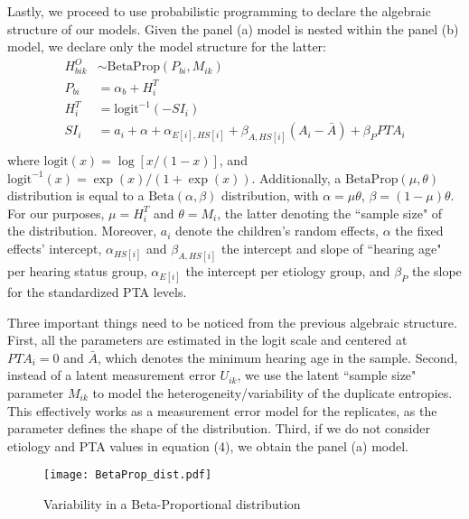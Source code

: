 Lastly, we proceed to use probabilistic programming to declare the algebraic structure of our models. Given the panel (a) model is nested within the panel (b) model, we declare only the model structure for the latter:
%
\begin{align}
	H^{O}_{bik} & \sim \text{BetaProp} \left( P_{bi}, M_{ik} \right) \\ 
	P_{bi} &= \alpha_{b} + H^{T}_{i} \\
	H^{T}_{i} &= \text{logit}^{-1}( -SI_{i} ) \\
	SI_{i} & = a_{i} + \alpha + \alpha_{E[i],HS[i]} + \beta_{A, HS[i]} (A_{i} - \bar{A}) + \beta_{P} PTA_{i} \\ 
\end{align}
%
where $\text{logit}(x) = \log \left[ x / ( 1 - x ) \right]$, and $\text{logit}^{-1}(x) = \exp(x) / ( 1 + \exp(x) ) $. Additionally, a $\text{BetaProp}(\mu, \theta)$ distribution is equal to a $\text{Beta}(\alpha, \beta)$ distribution, with $\alpha=\mu \theta$, $\beta=(1-\mu)\theta$. For our purposes, $\mu = H^{T}_{i}$ and $\theta = M_{i}$, the latter denoting the ``sample size" of the distribution. Moreover, $a_{i}$ denote the children's random effects, $\alpha$ the fixed effects' intercept, $\alpha_{HS[i]}$ and $\beta_{A, HS[i]}$ the intercept and slope of ``hearing age" per hearing status group, $\alpha_{E[i]}$ the intercept per etiology group, and $\beta_{P}$ the slope for the standardized PTA levels. 

Three important things need to be noticed from the previous algebraic structure. First, all the parameters are estimated in the logit scale and centered at $PTA_{i}=0$ and $\bar{A}$, which denotes the minimum hearing age in the sample. Second, instead of a latent measurement error $U_{ik}$, we use the latent ``sample size" parameter $M_{ik}$ to model the heterogeneity/variability of the duplicate entropies. This effectively works as a measurement error model for the replicates, as the parameter defines the shape of the distribution. Third, if we do not consider etiology and PTA values in equation (4), we obtain the panel (a) model.
%
\begin{figure}
	\centering
	\texttt{[image: BetaProp\_dist.pdf]}
	\caption{Variability in a Beta-Proportional distribution}
	\label{fig:BetaProp}
\end{figure}
%
%
